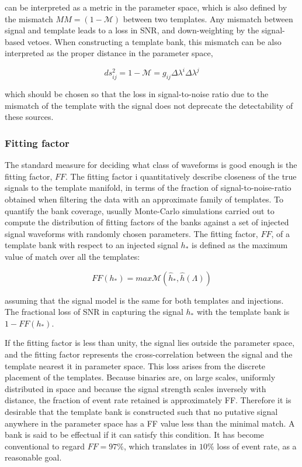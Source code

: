 \documentclass[binding=0.6cm, LaM]{sapthesis}
\begin{document}
	can be interpreted as a metric in the parameter space, which is also defined
	by the mismatch $MM = (1 − \mathcal{M})$ between two templates.
	Any mismatch between signal and template leads to a loss in SNR, 
	and down-weighting by the signal-based vetoes. 
	When constructing a template bank, this mismatch can be also interpreted 
	as the proper distance in the parameter space,	

		\begin{equation}
			ds_{ij}^2 = 1 − \mathcal{M} = g_{ij} \Delta \lambda^i \Delta \lambda^j
		\end{equation}

	which should be chosen so that the loss in signal-to-noise ratio due to the mismatch 
	of the template with the signal does not deprecate the detectability of these sources.

\subsubsection{Fitting factor}

	The standard measure for deciding what class 
	of waveforms is good enough is the fitting factor, $FF$.
	The fitting factor i quantitatively describe closeness of 
	the true signals to the template manifold, in terms of the fraction of 
	signal-to-noise-ratio obtained when filtering 
	the data with an approximate family of templates. 
	To quantify the bank coverage, usually Monte-Carlo simulations carried out   
	to compute the distribution of fitting factors of the banks against 
	a set of injected signal waveforms with randomly chosen parameters. 
	The fitting factor, $FF$, of a template bank with respect to an injected signal $h_{*}$ 
	is defined as the maximum value of match over all the templates:

		\begin{equation}
			FF(h_{*}) = max \mathcal{M}(\hat h_{*}, \hat h(\Lambda))
		\end{equation}

	assuming that the signal model is the same for both templates and injections. 
	The fractional loss of SNR in capturing the signal 
	$h_{*}$ with the template bank is $1 - FF(h_{*})$.

	If the fitting factor is less than unity, the signal lies outside the parameter space, 
	and the fitting factor represents the cross-correlation between 
	the signal and the template nearest it in parameter space. 
	This loss arises from the discrete placement of the templates. 
	Because binaries are, on large scales, uniformly distributed in space 
	and because the signal strength scales inversely with distance, 
	the fraction of event rate retained is approximately FF. 
	Therefore it is desirable that the template bank is constructed such that 
	no putative signal anywhere in the parameter space
	has a FF value less than the minimal match. 
	A bank is said to be effectual if it can satisfy this condition.
	It has become conventional to regard $FF = 97\%$, 
	which translates in $10\%$ loss of event rate, as a reasonable goal.
\end{document}
